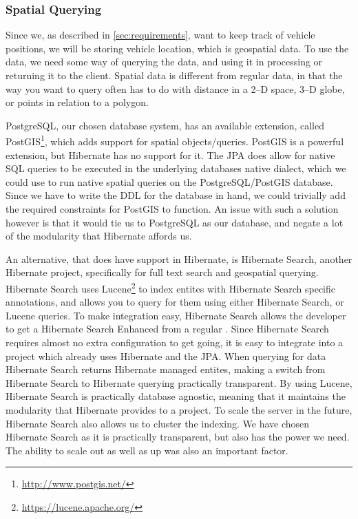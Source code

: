 \subsubsection{Spatial Querying}\label{subsubsec:spatialqueringtech}
Since we, as described in \cref{sec:requirements}, want to keep track of vehicle positions, we will be storing vehicle location, which is geospatial data.
To use the data, we need some way of querying the data, and using it in processing or returning it to the client.
Spatial data is different from regular data, in that the way you want to query often has to do with distance in a 2--D space, 3--D globe, or points in relation to a polygon.

PostgreSQL, our chosen database system, has an available extension, called PostGIS\footnote{\url{http://www.postgis.net/}}, which adds support for spatial objects/queries.
PostGIS is a powerful extension, but Hibernate has no support for it.
The \ac{JPA} does allow for native \ac{SQL} queries to be executed in the underlying databases native dialect, which we could use to run native spatial queries on the PostgreSQL/PostGIS database.
Since we have to write the \ac{DDL} for the database in hand, we could trivially add the required constraints for PostGIS to function.
An issue with such a solution however is that it would tie us to PostgreSQL as our database, and negate a lot of the modularity that Hibernate affords us.

An alternative, that does have support in Hibernate, is Hibernate Search, another Hibernate project, specifically for full text search and geospatial querying.
Hibernate Search uses Lucene\footnote{\url{https://lucene.apache.org/}} to index entites with Hibernate Search specific annotations, and allows you to query for them using either Hibernate Search, or Lucene queries.
To make integration easy, Hibernate Search allows the developer to get a Hibernate Search Enhanced  from a regular .
Since Hibernate Search requires almost no extra configuration to get going, it is easy to integrate into a project which already uses Hibernate and the \ac{JPA}.
When querying for data Hibernate Search returns Hibernate managed entites, making a switch from Hibernate Search to Hibernate querying practically transparent.
By using Lucene, Hibernate Search is practically database agnostic, meaning that it maintains the modularity that Hibernate provides to a project.
To scale the server in the future, Hibernate Search also allows us to cluster the indexing.
We have chosen Hibernate Search as it is practically transparent, but also has the power we need.
The ability to scale out as well as up was also an important factor.


